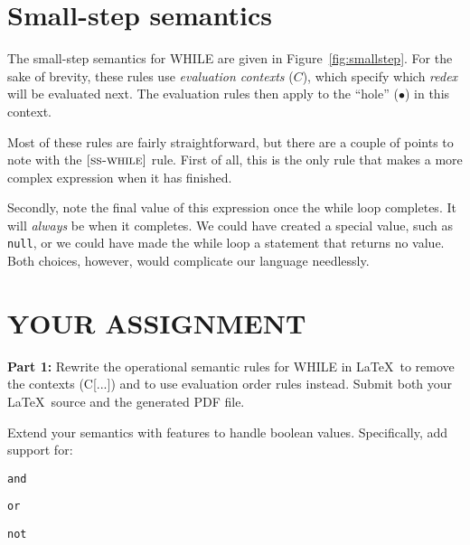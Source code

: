 \documentclass{article}
\newcommand{\rel}[1]{ \mbox{\sc [#1]} }
\begin{document}
\section{Small-step semantics}

\newcommand{\ssrule}[3]{
  \rel{#1} &
  \frac{\strut\begin{array}{@{}c@{}} #2 \end{array}}
       {\strut\begin{array}{@{}c@{}} #3 \end{array}}
   \\~\\
}
\newcommand{\sstep}[4]{\ctxt[{#1}],{#2} \rightarrow \ctxt[{#3}],{#4}}
\newcommand{\sstepraw}[4]{{#1},{#2} \rightarrow {#3},{#4}}
\newcommand{\ctxt}{C}

The small-step semantics for WHILE are given in Figure~\ref{fig:smallstep}.
For the sake of brevity, these rules use \emph{evaluation contexts} ($\ctxt$),
which specify which \emph{redex} will be evaluated next.
The evaluation rules then apply to the ``hole'' ($\bullet$) in this context.

Most of these rules are fairly straightforward, but there are a couple of points
to note with the $\rel{ss-while}$ rule.
First of all, this is the only rule that makes a more complex expression
when it has finished.

Secondly, note the final value of this expression once the while loop completes.
It will \emph{always} be {\false} when it completes.
We could have created a special value, such as {\tt null},
or we could have made the while loop a statement that returns no value.
Both choices, however, would complicate our language needlessly.


\section{YOUR ASSIGNMENT}
\newcommand{\bstep}[4]{{#1},{#2} \Downarrow {#3},{#4}}

\noindent
{\bf Part 1:}
Rewrite the operational semantic rules for WHILE in \LaTeX\
to remove the contexts (\ctxt[...])
and to use evaluation order rules instead.
Submit both your \LaTeX\ source and the generated PDF file.

Extend your semantics with features to handle boolean values.
Specifically, add support for:
\begin{compactitem}
  \item {\tt and}
  \item {\tt or}
  \item {\tt not}
\end{compactitem}
\end{document}
